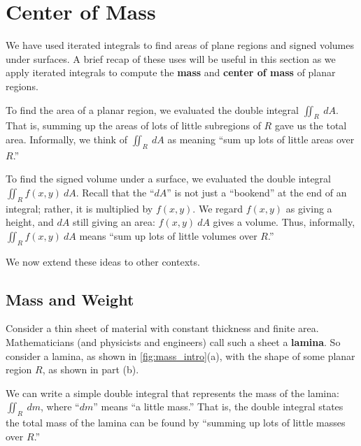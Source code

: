 \section{Center of Mass}\label{sec:center_of_mass}

We have used iterated integrals to find areas of plane regions and signed volumes under surfaces. A brief recap of these uses will be useful in this section as we apply iterated integrals to compute the \textbf{mass} and \textbf{center of mass} of planar regions.

To find the area of a planar region, we evaluated the double integral $\iint_R\ dA$. That is, summing up the areas of lots of little subregions of $R$ gave us the total area. Informally, we think of $\iint_R\ dA$ as meaning ``sum up lots of little areas over $R$.''

To find the signed volume under a surface, we evaluated the double integral $\iint_R f(x,y)\ dA$. Recall that the ``$dA$'' is not just a ``bookend'' at the end of an integral; rather, it is multiplied by $f(x,y)$. We regard $f(x,y)$ as giving a height, and $dA$ still giving an area: $f(x,y)\ dA$ gives a volume. Thus, informally, $\iint_Rf(x,y)\ dA$ means ``sum up lots of little volumes over $R$.''


We now extend these ideas to other contexts.

\subsection*{Mass and Weight}

Consider a thin sheet of material with constant thickness and finite area. Mathematicians (and physicists and engineers) call such a sheet a \textbf{lamina}. So consider a lamina, as shown in \autoref{fig:mass_intro}(a),  with the shape of some planar region $R$, as shown in part (b).

We can write a simple double integral that represents the mass of the lamina: $\iint_R\ dm$, where ``$dm$'' means ``a little mass.'' That is, the double integral states the total mass of the lamina can be found by ``summing up lots of little masses over $R$.''

